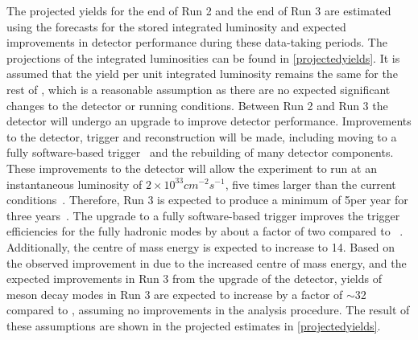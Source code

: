 The projected yields for the end of Run 2 and the end of Run 3 are estimated using the forecasts for the stored integrated luminosity and expected improvements in detector performance during these data-taking periods. The projections of the integrated luminosities can be found in \tab\ref{projectedyields}. It is assumed that the yield per unit integrated luminosity remains the same for the rest of \runtwo, which is a reasonable assumption as there are no expected significant changes to the detector or running conditions. Between Run 2 and Run 3 the detector will undergo an upgrade to improve detector performance. Improvements to the detector, trigger and reconstruction will be made, including moving to a fully software-based trigger~\cite{CERN-LHCC-2014-016} and the rebuilding of many detector components. These improvements to the detector will allow the experiment to run at an instantaneous luminosity of $2 \times 10^{33} cm^{-2}s^{-1}$, five times larger than the current conditions~\cite{CERN-LHCC-2014-016}. Therefore, Run 3 is expected to produce a minimum of 5\invfb per year for three years~\cite{CERN-LHCC-2014-016}. The upgrade to a fully software-based trigger improves the trigger efficiencies for the fully hadronic modes by about a factor of two compared to \runone~\cite{CERN-LHCC-2014-016}. Additionally, the centre of mass energy is expected to increase to 14\tev. Based on the observed improvement in \runtwo due to the increased centre of mass energy, and the expected improvements in Run 3 from the upgrade of the detector, yields of \B meson decay modes in Run 3 are expected to increase by a factor of $\sim$32 compared to \runone, assuming no improvements in the analysis procedure. The result of these assumptions are shown in the projected estimates in \tab\ref{projectedyields}.

\begin{table}
\caption{Yields and projected yields for different data-taking periods of the LHC. The entries in bold are projected yields, whereas the other entries refer to data used in this thesis. Projected results are justified in the text, with information taken from Ref.~\cite{CERN-LHCC-2014-016}.}
\label{projectedyields}
\end{table}

